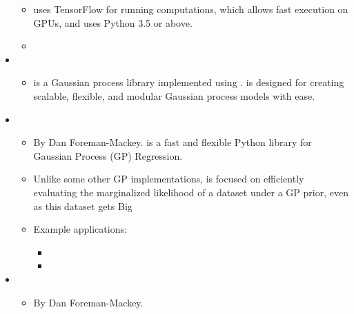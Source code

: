 \documentclass[letterpaper,10pt,english]{sphinxmanual}
\begin{document}
\begin{itemize}
\begin{itemize}
\item {} 
 uses TensorFlow for running computations, which allows
fast execution on GPUs, and uses Python 3.5 or above.

\item {} 

\end{itemize}

\item {} 
\begin{itemize}
\item {} 
 is a Gaussian process library implemented using
.  is designed for creating scalable,
flexible, and modular Gaussian process models with ease.

\end{itemize}

\item {} 
\begin{itemize}
\item {} 
By Dan Foreman-Mackey.  is a fast and flexible Python
library for Gaussian Process (GP) Regression.

\item {} 
Unlike some other GP implementations,  is focused on
efficiently evaluating the marginalized likelihood of a dataset
under a GP prior, even as this dataset gets Big

\item {} 
Example applications:
\begin{itemize}
\item {} 

\item {} 

\end{itemize}

\end{itemize}

\item {} 
\begin{itemize}
\item {} 
By Dan Foreman-Mackey. 


\end{itemize}
\end{itemize}
\end{document}
